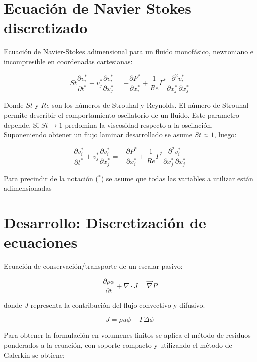 \section{Ecuación de Navier Stokes discretizado}

Ecuación de Navier-Stokes adimensional para un fluido monofásico, newtoniano e incompresible en coordenadas cartesianas:

\begin{equation}
St \dfrac{\partial v_i^*}{\partial t^*} + v_j^* \dfrac{\partial v_i^*}{\partial x_j^*} = - \dfrac{\partial P^*}{\partial x_i^*} + \dfrac{1}{Re} \Gamma^* \dfrac{\partial^2 v_i^*}{\partial x_j^* \, \partial x_j^*}
\end{equation}

Donde $St$ y $Re$ son los números de Strouhal y Reynolds. El número de Strouhal permite describir el comportamiento oscilatorio de un fluido. Este parametro depende. Si $St \rightarrow 1$ predomina la viscosidad respecto a la oscilación. Suponeniendo obtener un flujo laminar desarrollado se asume $St \approx 1$, luego:

\begin{equation}
\dfrac{\partial v_i^*}{\partial t^*} + v_j^* \dfrac{\partial v_i^*}{\partial x_j^*} = - \dfrac{\partial P^*}{\partial x_i^*} + \dfrac{1}{Re} \Gamma^* \dfrac{\partial^2 v_i^*}{\partial x_j^* \, \partial x_j^*}
\end{equation}  

Para precindir de la notación ($^*$) se asume que todas las variables a utilizar están adimensionadas

\section{Desarrollo: Discretización de ecuaciones}

Ecuación de conservación/transporte de un escalar pasivo:

\begin{equation}
\dfrac{\partial \rho \phi}{\partial t} + \nabla \cdot J = \vec{\nabla} P 
\end{equation}

donde $J$ representa la contribución del flujo convectivo y difusivo.

\begin{equation}
J = \rho u \phi - \Gamma \Delta \phi
\end{equation}

Para obtener la formulación en volumenes finitos se aplica el método de residuos ponderados a la ecuación, con soporte compacto y utilizando el método de Galerkin se obtiene:

